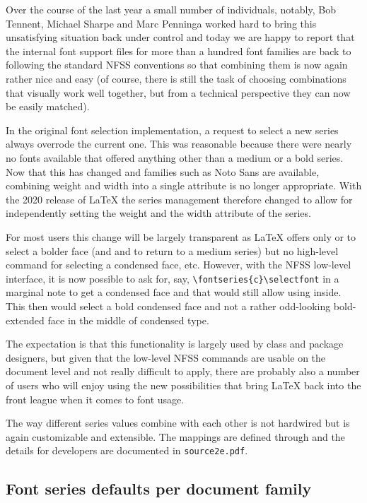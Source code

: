 \documentclass{ltnews}
\begin{document}
Over the course of the last year a small number of individuals,
notably, Bob Tennent, Michael Sharpe and Marc Penninga worked hard to
bring this unsatisfying situation back under control and today we are
happy to report that the internal font support files for more than a
hundred font families are back to following the standard NFSS conventions
so that combining them is now again rather nice and easy (of course,
there is still the task of choosing combinations that visually work
well together, but from a technical perspective they can now be easily
matched).


In the original font selection implementation, a request to select a new series
always overrode the current one. This was reasonable because there
were nearly no fonts available that offered anything other than a
medium or a bold series. Now that this has changed and families such
as Noto Sans are available, combining weight and width into a single
attribute is no longer appropriate. With the 2020 release of \LaTeX{}
the series management therefore changed to allow for independently
setting the weight and the width attribute of the series.

For most users this change will be largely transparent as \LaTeX{}
offers only  or  to select a bolder face (and
 and  to return to a medium series) but no
high-level command for selecting a condensed face, etc. However, with
the NFSS low-level interface, it is now possible to ask for, say,
\verb=\fontseries{c}\selectfont= in a marginal note to get a condensed
face and that would still allow  using  inside. This then would
select a bold condensed face and not a rather odd-looking
bold-extended face in the middle of condensed type.

The expectation is that this functionality is largely used by class and package
designers, but given that the low-level NFSS commands are usable on
the document level and not really difficult to apply, there are
probably also a number of users who will enjoy using the new
possibilities that bring \LaTeX{} back into the front league when it
comes to font usage.

The way different series values combine with each other is not
hardwired but is again customizable and extensible. The mappings are
defined through  and the details for
developers are documented in \texttt{source2e.pdf}.



\subsection{Font series defaults per document family}
\end{document}
